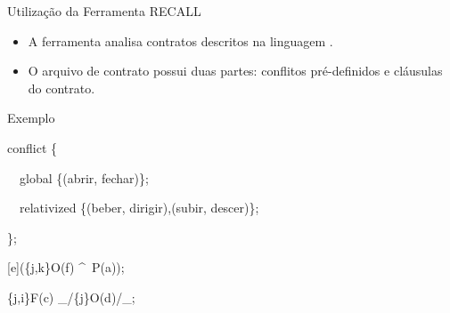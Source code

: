 \begin{frame}{Utilização da Ferramenta RECALL}
    \begin{itemize}
        \item A ferramenta analisa contratos descritos na linguagem \RCL.
        \item O arquivo de contrato possui duas partes: conflitos pré-definidos e cláusulas do contrato.
    \end{itemize}
    
    \begin{block}{Exemplo}
        \begin{semiverbatim}
            conflict \{
            
            \ \ global \{(abrir, fechar)\};
            
            \ \ relativized \{(beber, dirigir),(subir, descer)\};
            
            \};
            
            [e](\{j,k\}O(f) \textasciicircum \ P(a));
            
            \{j,i\}F(c) \_/\{j\}O(d)/\_;
        \end{semiverbatim}
    \end{block}
    
\end{frame}
